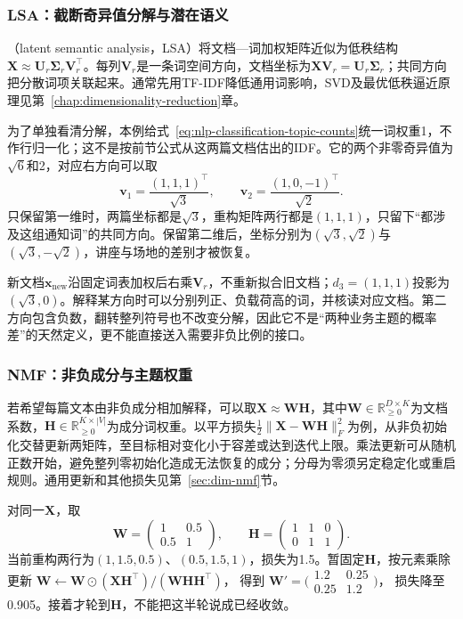 \FloatBarrier
\subsubsection{LSA：截断奇异值分解与潜在语义}
\label{sec:nlp-classification-lsa}

（latent semantic analysis，LSA）将文档—词加权矩阵近似为低秩结构$\bm X\approx\bm U_r\bm\Sigma_r\bm V_r^\top$。每列$\bm V_r$是一条词空间方向，文档坐标为$\bm X\bm V_r=\bm U_r\bm\Sigma_r$；共同方向把分散词项关联起来。通常先用TF-IDF降低通用词影响，SVD及最优低秩逼近原理见第~\ref{chap:dimensionality-reduction}章。

为了单独看清分解，本例给式~\eqref{eq:nlp-classification-topic-counts}统一词权重1，不作行归一化；这不是按前节公式从这两篇文档估出的IDF。它的两个非零奇异值为$\sqrt6$和2，对应右方向可以取
\[
 \bm v_1=\frac{(1,1,1)^\top}{\sqrt3},\qquad
 \bm v_2=\frac{(1,0,-1)^\top}{\sqrt2}.
\]
只保留第一维时，两篇坐标都是$\sqrt3$，重构矩阵两行都是$(1,1,1)$，只留下“都涉及这组通知词”的共同方向。保留第二维后，坐标分别为$(\sqrt3,\sqrt2)$与$(\sqrt3,-\sqrt2)$，讲座与场地的差别才被恢复。

新文档$\bm x_{\mathrm{new}}$沿固定词表加权后右乘$\bm V_r$，不重新拟合旧文档；$d_3=(1,1,1)$投影为$(\sqrt3,0)$。解释某方向时可以分别列正、负载荷高的词，并核读对应文档。第二方向包含负数，翻转整列符号也不改变分解，因此它不是“两种业务主题的概率差”的天然定义，更不能直接送入需要非负比例的接口。

\subsubsection{NMF：非负成分与主题权重}
\label{sec:nlp-classification-nmf}

若希望每篇文本由非负成分相加解释，可以取$\bm X\approx\bm W\bm H$，其中$\bm W\in\mathbb R_{\geq0}^{D\times K}$为文档系数，$\bm H\in\mathbb R_{\geq0}^{K\times|V|}$为成分词权重。以平方损失$\frac12\|\bm X-\bm W\bm H\|_F^2$为例，从非负初始化交替更新两矩阵，至目标相对变化小于容差或达到迭代上限。乘法更新可从随机正数开始，避免整列零初始化造成无法恢复的成分；分母为零须另定稳定化或重启规则。通用更新和其他损失见第~\ref{sec:dim-nmf}节。

对同一$\bm X$，取
\[
 \bm W=\begin{pmatrix}1&0.5\\0.5&1\end{pmatrix},\qquad
 \bm H=\begin{pmatrix}1&1&0\\0&1&1\end{pmatrix}.
\]
当前重构两行为$(1,1.5,0.5)$、$(0.5,1.5,1)$，损失为1.5。暂固定$\bm H$，按元素乘除更新
$\bm W\leftarrow\bm W\odot(\bm X\bm H^\top)/(\bm W\bm H\bm H^\top)$，
得到
$\bm W'=\bigl(\begin{smallmatrix}1.2&0.25\\0.25&1.2\end{smallmatrix}\bigr)$，
损失降至0.905。接着才轮到$\bm H$，不能把这半轮说成已经收敛。

